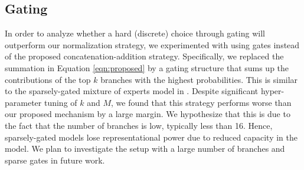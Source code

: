 \documentclass{article} %
\begin{document}

\subsection{Gating}
In order to analyze whether a hard (discrete) choice through gating will outperform our normalization strategy, we experimented with using gates instead of the proposed concatenation-addition strategy. Specifically, we replaced the summation in Equation \eqref{eqn:proposed} by a gating structure that sums up the contributions of the top $k$ branches with the highest probabilities. This is similar to the sparsely-gated mixture of experts model in \citet{shazeer2017outrageously}. Despite significant hyper-parameter tuning of $k$ and $M$, we found that this strategy performs worse than our proposed mechanism by a large margin. We hypothesize that this is due to the fact that the number of branches is low, typically less than 16. Hence, sparsely-gated models lose representational power due to reduced capacity in the model. We plan to investigate the setup with a large number of branches and sparse gates in future work. 

\end{document}
